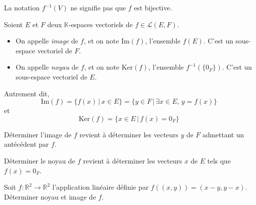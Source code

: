 \documentclass[a4paper,10pt]{report}
\begin{document}
 \begin{att} La notation $f^{-1}(V)$ ne signifie pas que $f$ est bijective.
 \end{att}
 
 \begin{defip} Soient $E$ et $F$ deux $\mathbb{K}$-espaces vectoriels de $f \in \mathcal{L}(E,F)$.
\begin{itemize}
 \item On appelle \textit{image} de $f$, et on note $\textrm{Im}(f)$, l'ensemble $f(E)$. C'est un sous-espace vectoriel de $F$.
 \item On appelle \textit{noyau} de $f$, et on note $\textrm{Ker}(f)$, l'ensemble $f^{-1}(\lbrace 0_F \rbrace)$. C'est un sous-espace vectoriel de $E$.
 \end{itemize}
 \end{defip}
 
 \noindent Autrement dit,
$$ \textrm{Im}(f)= \lbrace f(x) \, \vert \, x \in E \rbrace = \lbrace y \in F \, \vert \, \exists x \in E, \, y=f(x) \rbrace$$
et
$$ \textrm{Ker}(f) = \lbrace x \in E \, \vert \,  f(x)= 0_F \rbrace$$

\medskip

 \begin{rems} 
 \item Déterminer l'image de $f$ revient à déterminer les vecteurs $y$ de $F$ admettant un antécédent par $f$.
 \item Déterminer le noyau de $f$ revient à déterminer les vecteurs $x$ de $E$ tels que $f(x)= 0_F$.
 \end{rems}
 
 \newpage
 
 \begin{ex} Soit $f : \mathbb{R}^2 \rightarrow \mathbb{R}^2$ l'application linéaire définie par $f((x,y))=(x-y,y-x)$. Déterminer noyau et image de $f$.
 
% 

\vspace{7cm}
\end{ex}
\end{document}
